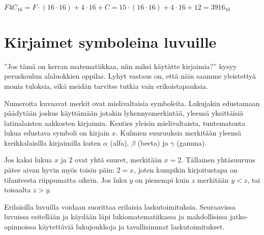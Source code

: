 \begin{esimerkki}
$F4C_{16} = F \cdot (16 \cdot 16) + 4 \cdot 16 + C = 15 \cdot (16 \cdot 16) + 4 \cdot 16 + 12 = 3916_{10}$
\end{esimerkki}


\section{Kirjaimet symboleina luvuille}

''Jos tämä on kerran matematiikkaa, niin miksi käytätte kirjaimia?'' kysyy peruskoulun alaluokkien oppilas. Lyhyt vastaus on, että näin saamme yleistettyä monia tuloksia, eikä meidän tarvitse tutkia vain erikoistapauksia.

Numeroita kuvaavat merkit ovat mielivaltaisia symboleita. Lukujakin edustamaan päädytään joskus käyttämään jotakin lyhennysmerkintää, yleensä yksittäisiä latinalaisten aakkosten kirjaimia. Kenties yleisin mielivaltaista, tuntematonta lukua edustava symboli on kirjain $x$. Kulmien suuruuksia merkitään yleensä kreikkalaisilla kirjaimilla kuten $\alpha$ (alfa), $\beta$ (beeta) ja $\gamma$ (gamma).

Jos kaksi lukua $x$ ja $2$ ovat yhtä suuret, merkitään
$x=2$. Tällainen yhtäsuuruus pätee aivan hyvin myös toisin päin: $2=x$, joten kumpikin kirjoitustapa on tilanteesta riippumatta oikein. Jos luku $y$ on pienempi kuin $z$ merkitään $y<z$, tai toisaalta $z>y$.


Erilaisilla luvuilla voidaan suorittaa erilaisia laskutoimituksia. Seuraavissa luvuissa esitellään ja käydään läpi lukiomatematiikassa ja mahdollisissa jatko-opinnoissa käytettäviä lukujoukkoja ja tavallisimmat laskutoimitukset.
